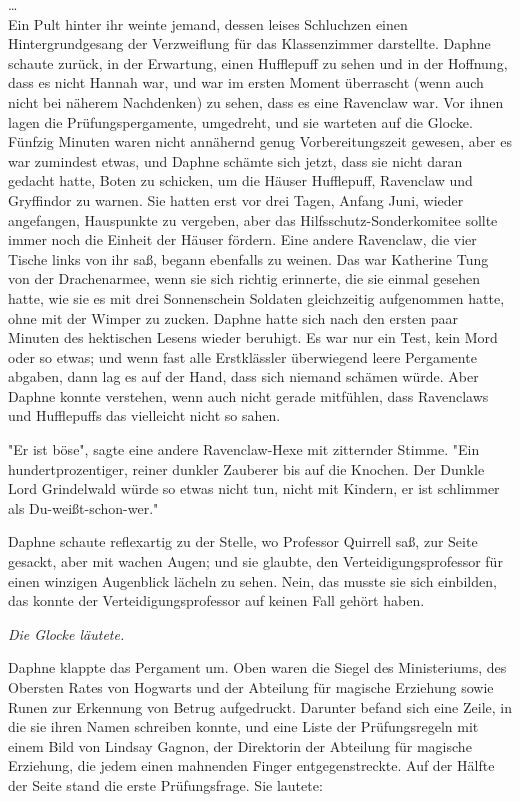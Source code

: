 {…\\ Ein Pult hinter ihr weinte jemand, dessen leises Schluchzen einen Hintergrundgesang der Verzweiflung für das Klassenzimmer darstellte. Daphne schaute zurück, in der Erwartung, einen Hufflepuff zu sehen und in der Hoffnung, dass es nicht Hannah war, und war im ersten Moment überrascht (wenn auch nicht bei näherem Nachdenken) zu sehen, dass es eine Ravenclaw war. Vor ihnen lagen die Prüfungspergamente, umgedreht, und sie warteten auf die Glocke. Fünfzig Minuten waren nicht annähernd genug Vorbereitungszeit gewesen, aber es war zumindest etwas, und Daphne schämte sich jetzt, dass sie nicht daran gedacht hatte, Boten zu schicken, um die Häuser Hufflepuff, Ravenclaw und Gryffindor zu warnen. Sie hatten erst vor drei Tagen, Anfang Juni, wieder angefangen, Hauspunkte zu vergeben, aber das Hilfsschutz-Sonderkomitee sollte immer noch die Einheit der Häuser fördern. Eine andere Ravenclaw, die vier Tische links von ihr saß, begann ebenfalls zu weinen. Das war Katherine Tung von der Drachenarmee, wenn sie sich richtig erinnerte, die sie einmal gesehen hatte, wie sie es mit drei Sonnenschein Soldaten gleichzeitig aufgenommen hatte, ohne mit der Wimper zu zucken. Daphne hatte sich nach den ersten paar Minuten des hektischen Lesens wieder beruhigt. Es war nur ein Test, kein Mord oder so etwas; und wenn fast alle Erstklässler überwiegend leere Pergamente abgaben, dann lag es auf der Hand, dass sich niemand schämen würde. Aber Daphne konnte verstehen, wenn auch nicht gerade mitfühlen, dass Ravenclaws und Hufflepuffs das vielleicht nicht so sahen.

"Er ist böse", sagte eine andere Ravenclaw-Hexe mit zitternder Stimme. "Ein hundertprozentiger, reiner dunkler Zauberer bis auf die Knochen. Der Dunkle Lord Grindelwald würde so etwas nicht tun, nicht mit Kindern, er ist schlimmer als Du-weißt-schon-wer."

Daphne schaute reflexartig zu der Stelle, wo Professor Quirrell saß, zur Seite gesackt, aber mit wachen Augen; und sie glaubte, den Verteidigungsprofessor für einen winzigen Augenblick lächeln zu sehen. Nein, das musste sie sich einbilden, das konnte der Verteidigungsprofessor auf keinen Fall gehört haben.

\emph{Die Glocke läutete.}

Daphne klappte das Pergament um. Oben waren die Siegel des Ministeriums, des Obersten Rates von Hogwarts und der Abteilung für magische Erziehung sowie Runen zur Erkennung von Betrug aufgedruckt. Darunter befand sich eine Zeile, in die sie ihren Namen schreiben konnte, und eine Liste der Prüfungsregeln mit einem Bild von Lindsay Gagnon, der Direktorin der Abteilung für magische Erziehung, die jedem einen mahnenden Finger entgegenstreckte. Auf der Hälfte der Seite stand die erste Prüfungsfrage. Sie lautete:

}

